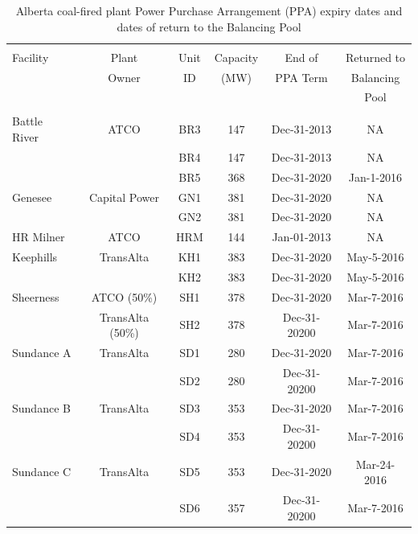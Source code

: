 \documentclass[12pt]{article}
\begin{document}
\begin{table}
\begin{tabular}{lccccc}
  \hline\\[-1.75ex]
Facility&Plant&Unit& Capacity& End of& Returned to\\
&Owner&         ID   &  (MW) &  PPA Term &Balancing\\
&&                 &    &      & Pool\\[+0.5ex]
\hline \\[-1.5ex]
Battle River& ATCO& BR3 &147& Dec-31-2013&NA\\
&&BR4 &147& Dec-31-2013&NA\\
&&BR5 &368& Dec-31-2020&Jan-1-2016\\[+0.75ex]
Genesee &Capital Power &GN1 &381 &Dec-31-2020&NA\\
&&GN2 &381 &Dec-31-2020&NA\\[+0.75ex]
HR Milner &ATCO& HRM& 144& Jan-01-2013&NA\\[+0.75ex]
Keephills& TransAlta & KH1 &383& Dec-31-2020&May-5-2016\\
&&KH2& 383& Dec-31-2020&May-5-2016\\[+0.75ex]
Sheerness &ATCO (50\%) & SH1& 378& Dec-31-2020&Mar-7-2016\\
&TransAlta (50\%)&SH2& 378& Dec-31-20200&Mar-7-2016\\[+0.75ex]
Sundance A &TransAlta&  SD1 &280& Dec-31-2020&Mar-7-2016\\
&&SD2 &280& Dec-31-20200&Mar-7-2016\\[+0.75ex]
Sundance B &TransAlta & SD3& 353& Dec-31-2020&Mar-7-2016\\
&&SD4 &353 &Dec-31-20200&Mar-7-2016\\[+0.75ex]
Sundance C &TransAlta& SD5& 353& Dec-31-2020&Mar-24-2016\\
&&SD6& 357& Dec-31-20200&Mar-7-2016\\[+0.75ex]
  \hline
\end{tabular}
\caption{Alberta coal-fired plant Power Purchase Arrangement (PPA) expiry dates and dates of return to the Balancing Pool}\label{tab:PPA}
\end{table}
\end{document}
